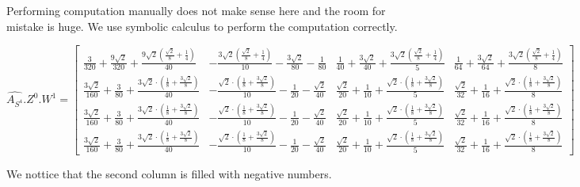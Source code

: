 \documentclass[a4paper]{article}
\begin{document}
Performing computation manually does not make sense here and the room for mistake is huge.
We use symbolic calculus to perform the computation correctly.

$\hat{A_{S^4}}.Z^{0}. W^{1} = 
\left[\begin{matrix}\frac{3}{320} + \frac{9 \sqrt{2}}{320} + \frac{9 \sqrt{2} \left(\frac{\sqrt{2}}{8} + \frac{1}{4}\right)}{40} & - \frac{3 \sqrt{2} \left(\frac{\sqrt{2}}{8} + \frac{1}{4}\right)}{10} - \frac{3 \sqrt{2}}{80} - \frac{1}{80} & \frac{1}{40} + \frac{3 \sqrt{2}}{40} + \frac{3 \sqrt{2} \left(\frac{\sqrt{2}}{8} + \frac{1}{4}\right)}{5} & \frac{1}{64} + \frac{3 \sqrt{2}}{64} + \frac{3 \sqrt{2} \left(\frac{\sqrt{2}}{8} + \frac{1}{4}\right)}{8}\\\frac{3 \sqrt{2}}{160} + \frac{3}{80} + \frac{3 \sqrt{2} \cdot \left(\frac{1}{8} + \frac{3 \sqrt{2}}{8}\right)}{40} & - \frac{\sqrt{2} \cdot \left(\frac{1}{8} + \frac{3 \sqrt{2}}{8}\right)}{10} - \frac{1}{20} - \frac{\sqrt{2}}{40} & \frac{\sqrt{2}}{20} + \frac{1}{10} + \frac{\sqrt{2} \cdot \left(\frac{1}{8} + \frac{3 \sqrt{2}}{8}\right)}{5} & \frac{\sqrt{2}}{32} + \frac{1}{16} + \frac{\sqrt{2} \cdot \left(\frac{1}{8} + \frac{3 \sqrt{2}}{8}\right)}{8}\\\frac{3 \sqrt{2}}{160} + \frac{3}{80} + \frac{3 \sqrt{2} \cdot \left(\frac{1}{8} + \frac{3 \sqrt{2}}{8}\right)}{40} & - \frac{\sqrt{2} \cdot \left(\frac{1}{8} + \frac{3 \sqrt{2}}{8}\right)}{10} - \frac{1}{20} - \frac{\sqrt{2}}{40} & \frac{\sqrt{2}}{20} + \frac{1}{10} + \frac{\sqrt{2} \cdot \left(\frac{1}{8} + \frac{3 \sqrt{2}}{8}\right)}{5} & \frac{\sqrt{2}}{32} + \frac{1}{16} + \frac{\sqrt{2} \cdot \left(\frac{1}{8} + \frac{3 \sqrt{2}}{8}\right)}{8}\\\frac{3 \sqrt{2}}{160} + \frac{3}{80} + \frac{3 \sqrt{2} \cdot \left(\frac{1}{8} + \frac{3 \sqrt{2}}{8}\right)}{40} & - \frac{\sqrt{2} \cdot \left(\frac{1}{8} + \frac{3 \sqrt{2}}{8}\right)}{10} - \frac{1}{20} - \frac{\sqrt{2}}{40} & \frac{\sqrt{2}}{20} + \frac{1}{10} + \frac{\sqrt{2} \cdot \left(\frac{1}{8} + \frac{3 \sqrt{2}}{8}\right)}{5} & \frac{\sqrt{2}}{32} + \frac{1}{16} + \frac{\sqrt{2} \cdot \left(\frac{1}{8} + \frac{3 \sqrt{2}}{8}\right)}{8}\end{matrix}\right]$

We nottice that the second column is filled with negative numbers.
\end{document}
